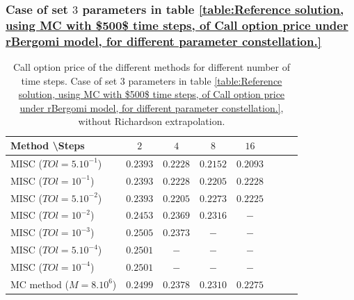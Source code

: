 \documentclass[11pt]{article}
\begin{document}
\subsubsection{Case of set $3$ parameters in table \ref{table:Reference solution, using MC with $500$ time steps, of Call option price under rBergomi model, for different parameter constellation.}}\label{sec:Case of set 3 parameters}
\begin{table}[h!]
\centering
\begin{tabular}{l*{6}{c}r}
Method \textbackslash  Steps            & $2$ & $4$ & $8$ & $16$ &   \\
\hline
MISC ($TOl=5.10^{-1}$)  & $0.2393$ & $0.2228$ & $0.2152$ & $0.2093$  \\
MISC ($TOl=10^{-1}$)  & $0.2393$ & $0.2228$ & $0.2205$ & $0.2228$  \\
MISC ($TOl=5.10^{-2}$)  & $0.2393$ & $0.2205$ & $0.2273$ & $0.2225$  \\
MISC ($TOl=10^{-2}$)  & $0.2453$ & $0.2369$ & $0.2316$ &$-$ \\
MISC ($TOl=10^{-3}$)  & $0.2505$ & $0.2373$ & $-$ & $-$  \\
MISC ($TOl=5.10^{-4}$)  & $0.2501$ & $-$ & $-$ & $-$  \\
MISC ($TOl=10^{-4}$)  & $0.2501$ & $-$ & $-$ & $-$  \\
\hline
MC method ($M=8.10^{6}$)   & $ 0.2499$ & $  0.2378$  & $ 0.2310
$ & $   0.2275$ \\		

\hline
\end{tabular}
\caption{ Call option price of the different methods for different number of time steps. Case of set $3$ parameters in table \ref{table:Reference solution, using MC with $500$ time steps, of Call option price under rBergomi model, for different parameter constellation.}, without Richardson extrapolation.}
\label{table: Call option price of the different methods for different number of time steps. Case set 3}
\end{table}
\end{document}
